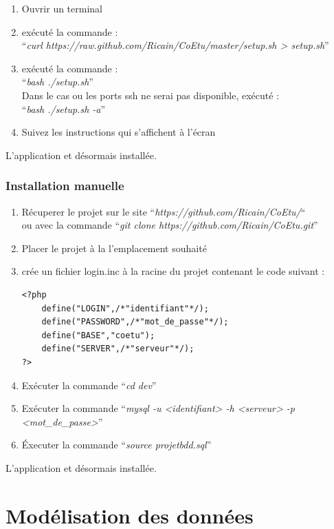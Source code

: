 \documentclass[a4paper,10pt]{report}
\begin{document}
\begin{enumerate}
    \item Ouvrir un terminal
    \item ex\'ecut\'e la commande : \\
          ``\textit{curl https://raw.github.com/Ricain/CoEtu/master/setup.sh > setup.sh}''
    \item ex\'ecut\'e la commande : \\
          ``\textit{bash ./setup.sh}'' \\
          Dans le cas ou les ports ssh ne serai pas disponible, ex\'ecut\'e : \\
          ``\textit{bash ./setup.sh -a}''
    \item Suivez les instructions qui s'affichent \`a l'\'ecran    
\end{enumerate}

L'application et d\'esormais install\'ee.
\newpage
\subsection{Installation manuelle}

\begin{enumerate}
    \item R\'ecuperer le projet sur le site ``\textit{https://github.com/Ricain/CoEtu/}``\\
          ou avec la commande ``\textit{git clone https://github.com/Ricain/CoEtu.git}''
    \item Placer le projet \`a la l'emplacement souhait\'e
    \item cr\'ee un fichier login.inc \`a la racine du projet contenant le code suivant :
    \begin{lstlisting}
<?php
    define("LOGIN",/*"identifiant"*/);
    define("PASSWORD",/*"mot_de_passe"*/);
    define("BASE","coetu");
    define("SERVER",/*"serveur"*/);
?>
    \end{lstlisting}
    \item Ex\'ecuter la commande ``\textit{cd dev}''
    \item Ex\'ecuter la commande ``\textit{mysql -u <identifiant> -h <serveur> -p <mot\_de\_passe>}''
    \item \'Executer la commande ``\textit{source projetbdd.sql}''
\end{enumerate}

L'application et d\'esormais install\'ee.

\chapter{Mod\'elisation des donn\'ees}
\end{document}
